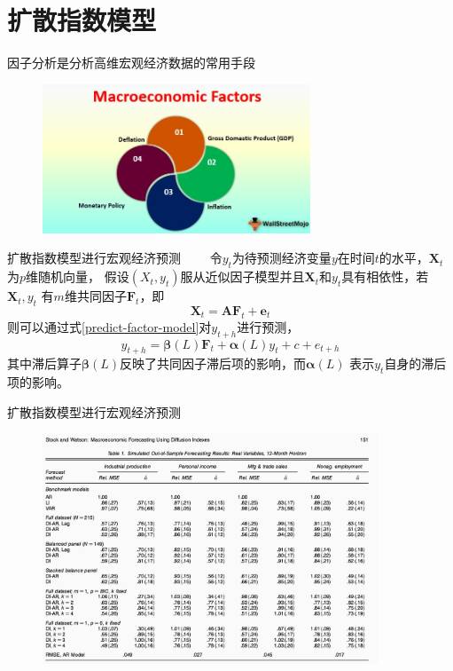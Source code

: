 \section{扩散指数模型}
\begin{frame}{因子分析是分析高维宏观经济数据的常用手段}

\begin{figure}[H]
\includegraphics[width=8cm]{pics/macroeco-demo.jpeg}
\end{figure}

\end{frame}

\begin{frame}{扩散指数模型进行宏观经济预测}
        \ \ \ \ 令$y_t$为待预测经济变量$y$在时间$t$的水平，$\bm{X}_t$为$p$维随机向量，
        假设$(X_t,y_t)$服从近似因子模型并且$\bm{X}_t$和$y_t$具有相依性，若$\bm{X}_t, y_t$
        有$m$维共同因子$\bm{F}_t$，即
    \begin{equation}
        \bm{X}_t = \bm{A}\bm{F}_t + \bm{e}_t
    \end{equation}
    则可以通过式\eqref{predict-factor-model}对$y_{t+h}$进行预测，
    \begin{equation}\label{predict-factor-model}
        y_{t+h} = \bm{\beta}(L)\bm{F}_t + \bm{\alpha}(L)y_t + c + e_{t+h}
    \end{equation}
    其中滞后算子$\bm{\beta}(L)$反映了共同因子滞后项的影响，而$\bm{\alpha}(L)$
    表示$y_t$自身的滞后项的影响。
\end{frame}

\begin{frame}{扩散指数模型进行宏观经济预测}
    \begin{figure}[H]
        \includegraphics[width=10cm]{pics/stock.png}
        \end{figure}
\end{frame}

